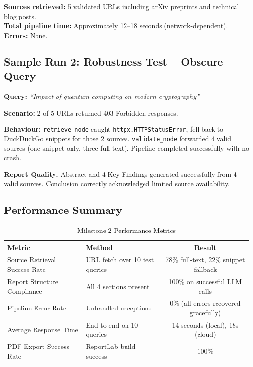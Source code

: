 \documentclass[12pt, a4paper]{article}
\begin{document}
\textbf{Sources retrieved:} 5 validated URLs including arXiv preprints and technical blog posts.\\
\textbf{Total pipeline time:} Approximately 12--18 seconds (network-dependent).\\
\textbf{Errors:} None.

\subsection{Sample Run 2: Robustness Test -- Obscure Query}

\textbf{Query:} \textit{``Impact of quantum computing on modern cryptography''}

\begin{outputbox}
\textbf{Scenario:} 2 of 5 URLs returned 403 Forbidden responses.

\textbf{Behaviour:} \texttt{retrieve\_node} caught \texttt{httpx.HTTPStatusError}, fell back to DuckDuckGo snippets for those 2 sources. \texttt{validate\_node} forwarded 4 valid sources (one snippet-only, three full-text). Pipeline completed successfully with no crash.

\textbf{Report Quality:} Abstract and 4 Key Findings generated successfully from 4 valid sources. Conclusion correctly acknowledged limited source availability.
\end{outputbox}

\subsection{Performance Summary}

\begin{table}[H]
\centering
\caption{Milestone 2 Performance Metrics}
\begin{tabular}{@{}llc@{}}
\toprule
\textbf{Metric} & \textbf{Method} & \textbf{Result} \\
\midrule
Source Retrieval Success Rate & URL fetch over 10 test queries & 78\% full-text, 22\% snippet fallback \\
Report Structure Compliance   & All 4 sections present          & 100\% on successful LLM calls \\
Pipeline Error Rate           & Unhandled exceptions            & 0\% (all errors recovered gracefully) \\
Average Response Time         & End-to-end on 10 queries        & 14 seconds (local), 18s (cloud) \\
PDF Export Success Rate       & ReportLab build success          & 100\% \\
\bottomrule
\end{tabular}
\end{table}
\end{document}
